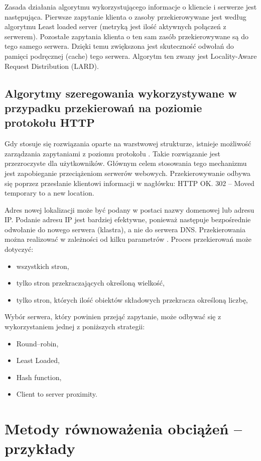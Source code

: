Zasada działania algorytmu wykorzystującego informacje o kliencie i serwerze jest następująca. Pierwsze zapytanie klienta o 
zasoby przekierowywane jest według algorytmu Least loaded server (metryką jest ilość aktywnych połączeń z serwerem). Pozostałe 
zapytania klienta o ten sam zasób przekierowywane są do tego samego serwera. Dzięki temu zwiększona jest skuteczność odwołań 
do pamięci podręcznej (cache) tego serwera. Algorytm ten zwany jest Locality-Aware Request Distribution (LARD).

\subsection{Algorytmy szeregowania wykorzystywane w przypadku przekierowań na poziomie protokołu HTTP}

Gdy stosuje się rozwiązania oparte na warstwowej strukturze, istnieje możliwość zarządzania zapytaniami z poziomu protokołu \cite{modele18}. 
Takie rozwiązanie jest przezroczyste dla użytkowników. Głównym celem stosowania tego mechanizmu jest zapobieganie 
przeciążeniom serwerów webowych. Przekierowywanie odbywa się poprzez przesłanie klientowi informacji w nagłówku: HTTP OK. 
302 -- Moved temporary to a new location.

Adres nowej lokalizacji może być podany w postaci nazwy domenowej lub adresu IP. Podanie adresu IP jest bardziej efektywne, 
ponieważ następuje bezpośrednie odwołanie do nowego serwera (klastra), a nie do serwera DNS.
Przekierowania można realizować w zależności od kilku parametrów \cite{modele13}. Proces przekierowań może dotyczyć:
\begin{itemize}
\item wszystkich stron,
\item tylko stron przekraczających określoną wielkość,
\item tylko stron, których ilość obiektów składowych przekracza określoną liczbę,
\end{itemize}

Wybór serwera, który powinien przejąć zapytanie, może odbywać się z wykorzystaniem jednej z poniższych strategii:
\begin{itemize}
\item Round--robin,
\item Least Loaded,
\item Hash function,
\item Client to server proximity.
\end{itemize}

\section{Metody równoważenia obciążeń -- przykłady}

